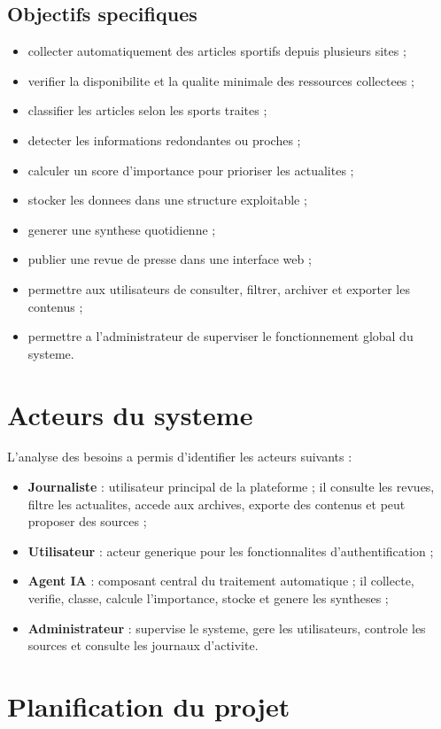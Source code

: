 \documentclass[12pt,a4paper,oneside]{report}
\begin{document}
\subsection{Objectifs specifiques}
\begin{itemize}
\item collecter automatiquement des articles sportifs depuis plusieurs sites ;
\item verifier la disponibilite et la qualite minimale des ressources collectees ;
\item classifier les articles selon les sports traites ;
\item detecter les informations redondantes ou proches ;
\item calculer un score d'importance pour prioriser les actualites ;
\item stocker les donnees dans une structure exploitable ;
\item generer une synthese quotidienne ;
\item publier une revue de presse dans une interface web ;
\item permettre aux utilisateurs de consulter, filtrer, archiver et exporter les contenus ;
\item permettre a l'administrateur de superviser le fonctionnement global du systeme.
\end{itemize}

\section{Acteurs du systeme}
L'analyse des besoins a permis d'identifier les acteurs suivants :
\begin{itemize}
\item \textbf{Journaliste} : utilisateur principal de la plateforme ; il consulte les revues, filtre les actualites, accede aux archives, exporte des contenus et peut proposer des sources ;
\item \textbf{Utilisateur} : acteur generique pour les fonctionnalites d'authentification ;
\item \textbf{Agent IA} : composant central du traitement automatique ; il collecte, verifie, classe, calcule l'importance, stocke et genere les syntheses ;
\item \textbf{Administrateur} : supervise le systeme, gere les utilisateurs, controle les sources et consulte les journaux d'activite.
\end{itemize}

\section{Planification du projet}
\end{document}
